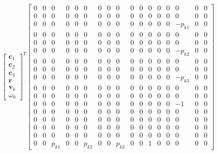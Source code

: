 \documentclass{article}
\begin{document}
\begin{align}
    \begin{bmatrix}
        \mathbf{c}_1 \\
        \mathbf{c}_2 \\
        \mathbf{c}_3 \\
        \mathbf{r} \\
        \mathbf{v}_k \\
        \omega_0
    \end{bmatrix}^T 
    \begin{bmatrix}
        0 & 0 & 0 & 0 & 0 & 0 & 0 & 0 & 0 & 0 & 0 & 0 & 0 & 0 & 0 & 0 & 0 \\
        0 & 0 & 0 & 0 & 0 & 0 & 0 & 0 & 0 & 0 & 0 & 0 & 0 & 0 & 0 & 0 & 0 \\
        0 & 0 & 0 & 0 & 0 & 0 & 0 & 0 & 0 & 0 & 0 & 0 & 0 & 0 & -p_{k1} & 0 & 0 \\
        0 & 0 & 0 & 0 & 0 & 0 & 0 & 0 & 0 & 0 & 0 & 0 & 0 & 0 & 0 & 0 & 0 \\
        0 & 0 & 0 & 0 & 0 & 0 & 0 & 0 & 0 & 0 & 0 & 0 & 0 & 0 & 0 & 0 & 0 \\
        0 & 0 & 0 & 0 & 0 & 0 & 0 & 0 & 0 & 0 & 0 & 0 & 0 & 0 & -p_{k2} & 0 & 0 \\
        0 & 0 & 0 & 0 & 0 & 0 & 0 & 0 & 0 & 0 & 0 & 0 & 0 & 0 & 0 & 0 & 0 \\
        0 & 0 & 0 & 0 & 0 & 0 & 0 & 0 & 0 & 0 & 0 & 0 & 0 & 0 & 0 & 0 & 0 \\
        0 & 0 & 0 & 0 & 0 & 0 & 0 & 0 & 0 & 0 & 0 & 0 & 0 & 0 & -p_{k3} & 0 & 0 \\
        0 & 0 & 0 & 0 & 0 & 0 & 0 & 0 & 0 & 0 & 0 & 0 & 0 & 0 & 0 & 0 & 0 \\
        0 & 0 & 0 & 0 & 0 & 0 & 0 & 0 & 0 & 0 & 0 & 0 & 0 & 0 & 0 & 0 & 0 \\
        0 & 0 & 0 & 0 & 0 & 0 & 0 & 0 & 0 & 0 & 0 & 0 & 0 & 0 & -1 & 0 & 0 \\
        0 & 0 & 0 & 0 & 0 & 0 & 0 & 0 & 0 & 0 & 0 & 0 & 0 & 0 & 0 & 0 & 0 \\
        0 & 0 & 0 & 0 & 0 & 0 & 0 & 0 & 0 & 0 & 0 & 0 & 0 & 0 & 0 & 0 & 0 \\
        0 & 0 & 0 & 0 & 0 & 0 & 0 & 0 & 0 & 0 & 0 & 0 & 0 & 0 & 0 & 0 & 0 \\
        0 & 0 & 0 & 0 & 0 & 0 & 0 & 0 & 0 & 0 & 0 & 0 & 0 & 0 & 0 & 0 & 0 \\
        0 & 0 & p_{k1} & 0 & 0 & p_{k2} & 0 & 0 & p_{k3} & 0 & 0 & 1 & 0 & 0 & 0 & 0 & 0
    \end{bmatrix}

\end{align}
\end{document}
